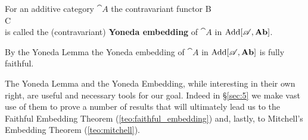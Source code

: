 \begin{definition}
  \label{def:yoneda_embedding}
  For an additive category \(\cat{A}\) the contravariant functor
  {B \ar[d, "\displaystyle f"']\\ C}
  { \\  }
  is called the (contravariant) {\bf Yoneda embedding} of \(\cat{A}\) in \(\text{\normalfont Add}[{\mathscr A}, \text{\normalfont\textbf{Ab}}]\).
\end{definition}

\begin{remark}
  \label{rem:yoneda_embedding_full_and_faithful}
  By the Yoneda Lemma the Yoneda embedding of \(\cat{A}\) in \(\text{\normalfont Add}[{\mathscr A}, \text{\normalfont\textbf{Ab}}]\) is fully faithful.
\end{remark}

The Yoneda Lemma and the Yoneda Embedding, while interesting in their own right, are useful and necessary tools for our goal. Indeed in \S\ref{sec:5} we make vast use of them to prove a number of results that will ultimately lead us to the Faithful Embedding Theorem (\ref{teo:faithful_embedding}) and, lastly, to Mitchell's Embedding Theorem (\ref{teo:mitchell}).

